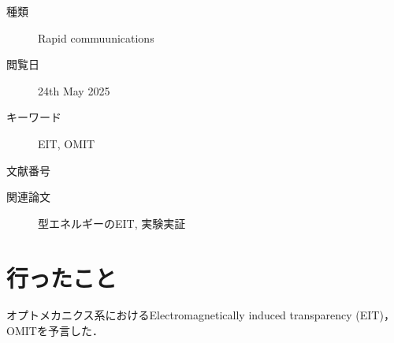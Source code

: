\begin{boxnote}
      \begin{description}
        \item[種類] Rapid commuunications
        \item[閲覧日] 24th May 2025
        \item[キーワード] EIT, OMIT
        \item[文献番号] \cite{PhysRevA.81.041803}
        \item[関連論文] \Lambda 型エネルギーのEIT\cite{PhysRevLett.84.5094}, 実験実証\cite{science.1195596}
      \end{description}
    \end{boxnote}
    \section{行ったこと}
      オプトメカニクス系におけるElectromagnetically induced transparency (EIT)，OMITを予言した．
